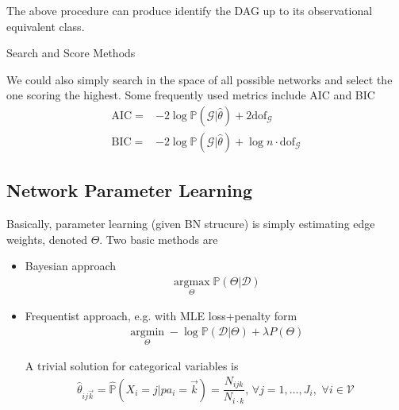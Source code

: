 The above procedure can produce identify the DAG up to its observational equivalent class.




\begin{point}
    Search and Score Methods
\end{point}

We could also simply search in the space of all possible networks and select the one scoring the highest. Some frequently used metrics include AIC and BIC
\begin{align}
    \mathrm{AIC}=&-2\log \mathbb{P}\left( \mathcal{G}|\hat{\theta }  \right) + 2\mathrm{dof}_\mathcal{G} \\
    \mathrm{BIC}=&-2\log \mathbb{P}\left( \mathcal{G}|\hat{\theta } \right) +\log n \cdot \mathrm{dof}_\mathcal{G}   
\end{align}



\subsection{Network Parameter Learning}
Basically, parameter learning (given BN strucure) is simply estimating edge weights, denoted $ \varTheta $. Two basic methods are 
\begin{itemize}[topsep=2pt,itemsep=0pt]
    \item Bayesian approach
    \begin{align}
        \mathop{\arg\max}\limits_{\varTheta}\mathbb{P}(\varTheta|\mathcal{D})  
    \end{align}
    \item Frequentist approach, e.g. with MLE loss+penalty form
    \begin{align}
         \mathop{\arg\min}\limits_{\varTheta}-\log\mathbb{P}\left( \mathcal{D}|\varTheta \right) + \lambda P(\varTheta)  
    \end{align}

    A trivial solution for categorical variables is 
    \begin{align}
        \hat{\theta}_{ij\vec{k}}=\hat{\mathbb{P}}(X_i=j|pa_{i}=\vec{k})=\dfrac{N_{ijk}}{N_{i\cdot k}},\,\forall j=1,\ldots,J_{i} ,\,\,\forall i\in\mathcal{V}
    \end{align}
    
    
\end{itemize}

    
